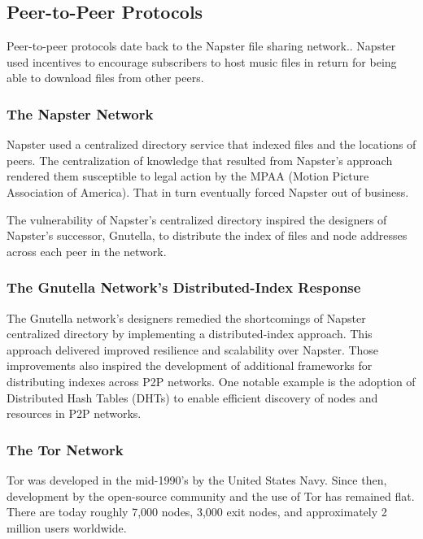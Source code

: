 \subsection{Peer-to-Peer Protocols}
Peer-to-peer protocols date back to the Napster file sharing network.\cite{42}. Napster used incentives to encourage subscribers to host music files in return for being able to download files from other peers.

\subsubsection{The Napster Network}
Napster used a centralized directory service that indexed files and the locations of peers. The centralization of knowledge that resulted from Napster's approach rendered them susceptible to legal action by the MPAA (Motion Picture Association of America). That in turn eventually forced Napster out of business.

The vulnerability of Napster's centralized directory inspired the designers of Napster's successor, Gnutella, to  distribute the index of files and node addresses across each peer in the network\cite{43}.

\subsubsection{The Gnutella Network's Distributed-Index Response}
The Gnutella network's designers remedied the shortcomings of Napster centralized directory by implementing a distributed-index approach. This approach delivered improved resilience and scalability over Napster. Those improvements also inspired the development of additional frameworks for distributing indexes across P2P networks. One notable example is the adoption of Distributed Hash Tables (DHTs) to enable efficient discovery of nodes and resources in P2P networks.

\subsubsection{The Tor Network}
\label{subsec: tornetwork}

Tor was developed in the mid-1990’s by the United States Navy. Since then, development by the open-source community and the use of Tor has remained flat. There are today roughly 7,000 nodes, 3,000 exit nodes, and approximately 2 million users worldwide.


